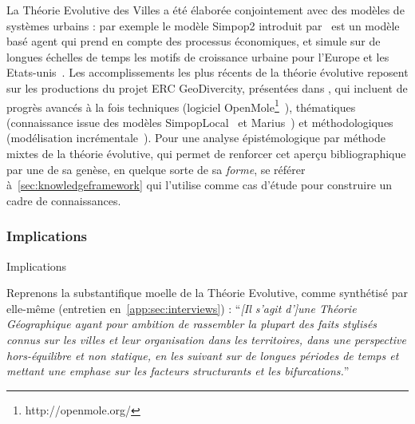 La Théorie Evolutive des Villes a été élaborée conjointement avec des modèles de systèmes urbains : par exemple le modèle Simpop2 introduit par~\cite{bretagnolle2006theory} est un modèle basé agent qui prend en compte des processus économiques, et simule sur de longues échelles de temps les motifs de croissance urbaine pour l'Europe et les Etats-unis~\cite{doi:10.1177/0042098010377366}. Les accomplissements les plus récents de la théorie évolutive reposent sur les productions du projet ERC GeoDivercity, présentées dans \cite{pumain2017urban}, qui incluent de progrès avancés à la fois techniques (logiciel OpenMole\footnote{http://openmole.org/}~\cite{reuillon2013openmole}), thématiques (connaissance issue des modèles SimpopLocal~\cite{schmitt2014modelisation} et Marius~\cite{cottineau2014evolution}) et méthodologiques (modélisation incrémentale~\cite{cottineau2015incremental}). Pour une analyse épistémologique par méthode mixtes de la théorie évolutive, qui permet de renforcer cet aperçu bibliographique par une de sa genèse, en quelque sorte de sa \emph{forme}, se référer à~\ref{sec:knowledgeframework} qui l'utilise comme cas d'étude pour construire un cadre de connaissances.



\subsubsection*{Implications}{Implications}


Reprenons la substantifique moelle de la Théorie Evolutive, comme synthétisé par  elle-même (entretien en~\ref{app:sec:interviews}) : ``\textit{[Il s'agit d']une Théorie Géographique ayant pour ambition de rassembler la plupart des faits stylisés connus sur les villes et leur organisation dans les territoires, dans une perspective hors-équilibre et non statique, en les suivant sur de longues périodes de temps et mettant une emphase sur les facteurs structurants et les bifurcations.}''












